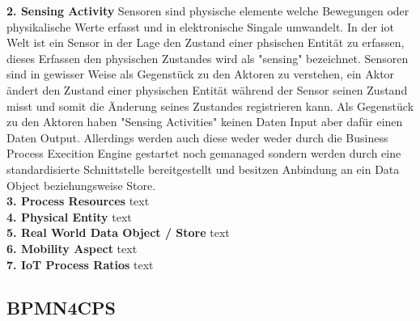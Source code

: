 \documentclass[a4paper, 12pt, twoside, headsepline=true]{scrartcl} %
\begin{document}
\textbf{2. Sensing Activity}
\newline
Sensoren sind physische elemente welche Bewegungen oder physikalische Werte erfasst und in elektronische Singale umwandelt. In der \ac{iot} Welt ist ein Sensor in der Lage den Zustand einer phsischen Entität zu erfassen, dieses Erfassen den physischen Zustandes wird als "sensing" bezeichnet. Sensoren sind in gewisser Weise als Gegenstück zu den Aktoren zu verstehen, ein Aktor ändert den Zustand einer physischen Entität während der Sensor seinen Zustand misst und somit die Änderung seines Zustandes registrieren kann. Als Gegenstück zu den Aktoren haben "Sensing Activities" keinen Daten Input aber dafür einen Daten Output. Allerdings werden auch diese weder weder durch die Business Process Execition Engine gestartet noch gemanaged sondern werden durch eine standardisierte Schnittstelle bereitgestellt und besitzen Anbindung an ein Data Object beziehungsweise Store.
\\

\textbf{3. Process Resources}
\newline
text
\\

\textbf{4. Physical Entity}
\newline
text
\\

\textbf{5. Real World Data Object / Store}
\newline
text
\\

\textbf{6. Mobility Aspect}
\newline
text
\\

\textbf{7. IoT Process Ratios}
\newline
text
\\

\subsection{BPMN4CPS}

\newpage
\end{document}
